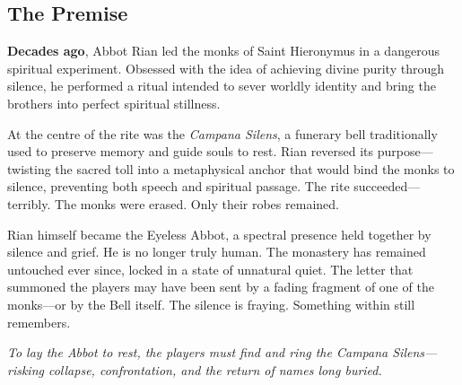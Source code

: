 \documentclass[nodeprecatedcode,bg=print]{dndbook/dndbook}
\begin{document}
\subsection*{The Premise}
\textbf{Decades ago}, Abbot Rian led the monks of Saint Hieronymus in a dangerous spiritual experiment. Obsessed with the idea of achieving divine purity through silence, he performed a ritual intended to sever worldly identity and bring the brothers into perfect spiritual stillness.

At the centre of the rite was the \emph{Campana Silens}, a funerary bell traditionally used to preserve memory and guide souls to rest. Rian reversed its purpose—twisting the sacred toll into a metaphysical anchor that would bind the monks to silence, preventing both speech and spiritual passage. The rite succeeded—terribly. The monks were erased. Only their robes remained.

Rian himself became the Eyeless Abbot, a spectral presence held together by silence and grief. He is no longer truly human. The monastery has remained untouched ever since, locked in a state of unnatural quiet. The letter that summoned the players may have been sent by a fading fragment of one of the monks—or by the Bell itself. The silence is fraying. Something within still remembers.

\emph{To lay the Abbot to rest, the players must find and ring the Campana Silens—risking collapse, confrontation, and the return of names long buried.}
\end{document}
